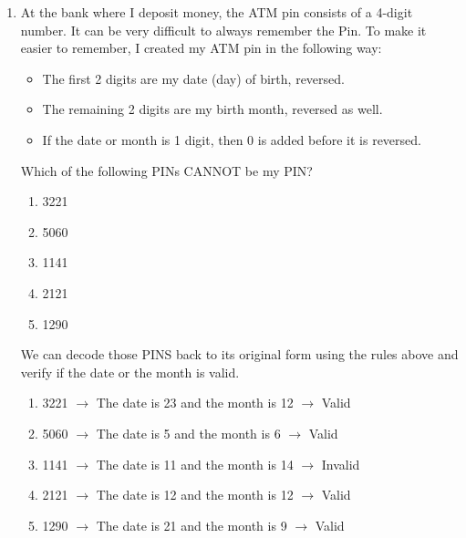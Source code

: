 \documentclass[12pt,titlepage]{article}
\begin{document}
\begin{enumerate}
{        From this table, we can make a conclusion that there are 6 stack classes based on their height.
    }
    \pagebreak
    \item {
        At the bank where I deposit money, the ATM pin consists of a 4-digit number. It can be very difficult to always
        remember the Pin. To make it easier to remember, I created my ATM pin in the following way:
        \begin{itemize}
            \item The first 2 digits are my date (day) of birth, reversed.
            \item The remaining 2 digits are my birth month, reversed as well.
            \item If the date or month is 1 digit, then 0 is added before it is reversed.
        \end{itemize}
        Which of the following PINs CANNOT be my PIN?
        \begin{enumerate}[label=\Alph*.]
            \item 3221
            \item 5060
            \item 1141
            \item 2121
            \item 1290
        \end{enumerate}
        
        We can decode those PINS back to its original form using the rules above and verify if the date or the month is valid.
        \begin{enumerate}[label=\Alph*.]
            \item 3221 $\rightarrow$ The date is 23 and the month is 12 $\rightarrow$ Valid
            \item 5060 $\rightarrow$ The date is 5 and the month is 6 $\rightarrow$ Valid
            \item 1141 $\rightarrow$ The date is 11 and the month is 14 $\rightarrow$ Invalid
            \item 2121 $\rightarrow$ The date is 12 and the month is 12 $\rightarrow$ Valid
            \item 1290 $\rightarrow$ The date is 21 and the month is 9 $\rightarrow$ Valid
        \end{enumerate}
        
}
\end{enumerate}
\end{document}
